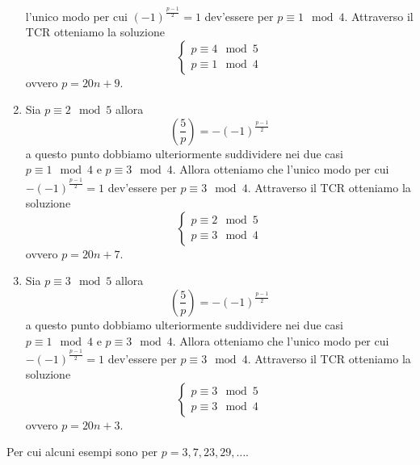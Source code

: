 \begin{esercizio}
\begin{enumerate}
			l'unico modo per cui  $(-1)^{\frac{p-1}{2}}= 1$ dev'essere per
			$p \equiv 1 \mod 4$. Attraverso il TCR otteniamo la soluzione
			\begin{equation*}
				\begin{cases}
					p \equiv 4 \mod 5 \\
					p \equiv 1 \mod 4
				\end{cases}
			\end{equation*}
			ovvero $p = 20n + 9$.
		\item Sia $p \equiv 2 \mod 5$ allora 
			\begin{equation*}
				\left(\frac{5}{p}\right) = -(-1)^{\frac{p-1}{2}}
			\end{equation*}
			a questo punto dobbiamo ulteriormente suddividere nei due casi 
			$p \equiv 1 \mod 4$ e $p \equiv 3 \mod 4$. Allora otteniamo che
			l'unico modo per cui  $-(-1)^{\frac{p-1}{2}}= 1$ dev'essere per
			$p \equiv 3 \mod 4$. Attraverso il TCR otteniamo la soluzione
			\begin{equation*}
				\begin{cases}
					p \equiv 2 \mod 5 \\
					p \equiv 3 \mod 4
				\end{cases}
			\end{equation*}
			ovvero $p = 20n + 7$.
		\item Sia $p \equiv 3 \mod 5$ allora 
			\begin{equation*}
				\left(\frac{5}{p}\right) = -(-1)^{\frac{p-1}{2}}
			\end{equation*}
			a questo punto dobbiamo ulteriormente suddividere nei due casi 
			$p \equiv 1 \mod 4$ e $p \equiv 3 \mod 4$. Allora otteniamo che
			l'unico modo per cui  $-(-1)^{\frac{p-1}{2}}= 1$ dev'essere per
			$p \equiv 3 \mod 4$. Attraverso il TCR otteniamo la soluzione
			\begin{equation*}
				\begin{cases}
					p \equiv 3 \mod 5 \\
					p \equiv 3 \mod 4
				\end{cases}
			\end{equation*}
			ovvero $p = 20n + 3$.
	\end{enumerate}
	Per cui alcuni esempi sono per $p = 3, 7, 23, 29, \dots$.
\end{esercizio}
